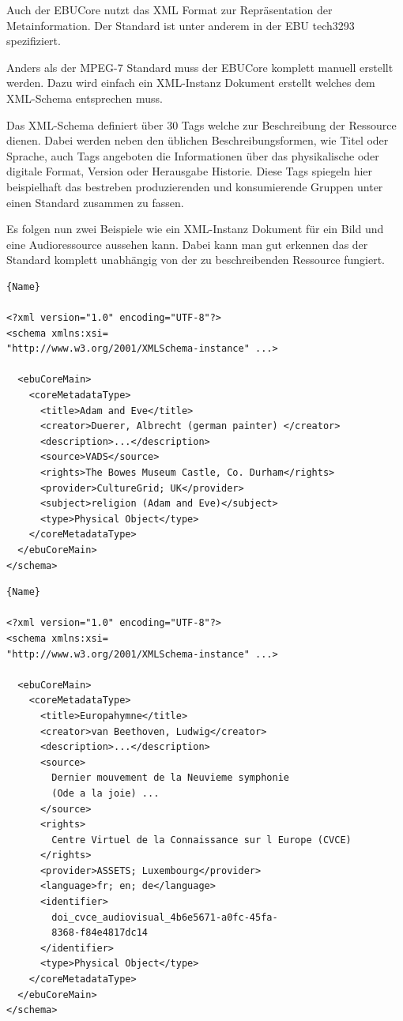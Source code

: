 	Auch der EBUCore nutzt das XML Format zur Repräsentation der Metainformation. Der Standard ist unter anderem in der EBU tech3293 spezifiziert.
	
	Anders als der MPEG-7 Standard muss der EBUCore komplett manuell erstellt werden. Dazu wird einfach ein XML-Instanz Dokument erstellt welches dem XML-Schema entsprechen muss.
	
	Das XML-Schema definiert über 30 Tags welche zur Beschreibung der Ressource dienen. Dabei werden neben den üblichen Beschreibungsformen, wie Titel oder Sprache, auch Tags angeboten die Informationen über das physikalische oder digitale  Format, Version oder Herausgabe Historie. Diese Tags spiegeln hier beispielhaft das bestreben produzierenden und konsumierende Gruppen unter einen Standard zusammen zu fassen.
	
	Es folgen nun zwei Beispiele wie ein XML-Instanz Dokument für ein Bild und eine Audioressource aussehen kann. Dabei kann man gut erkennen das der Standard komplett unabhängig von der zu beschreibenden Ressource fungiert.

\begin{lstlisting}[caption=Beispiel-XML EBUCore für Albrecht Dürers Bild: Adam und Eva]{Name}

<?xml version="1.0" encoding="UTF-8"?>
<schema xmlns:xsi=
"http://www.w3.org/2001/XMLSchema-instance" ...>

  <ebuCoreMain>
    <coreMetadataType>
      <title>Adam and Eve</title>
      <creator>Duerer, Albrecht (german painter) </creator>
      <description>...</description>
      <source>VADS</source>  
      <rights>The Bowes Museum Castle, Co. Durham</rights>
      <provider>CultureGrid; UK</provider>
      <subject>religion (Adam and Eve)</subject>
      <type>Physical Object</type>
    </coreMetadataType>
  </ebuCoreMain>
</schema>
\end{lstlisting}


\begin{lstlisting}[caption=Beispiel-XML EBUCore für die Europahymne]{Name}

<?xml version="1.0" encoding="UTF-8"?>
<schema xmlns:xsi=
"http://www.w3.org/2001/XMLSchema-instance" ...>

  <ebuCoreMain>
    <coreMetadataType>
      <title>Europahymne</title>
      <creator>van Beethoven, Ludwig</creator>
      <description>...</description>
      <source>
      	Dernier mouvement de la Neuvieme symphonie 
      	(Ode a la joie) ...
      </source>  
      <rights>
      	Centre Virtuel de la Connaissance sur l Europe (CVCE)
      </rights>
      <provider>ASSETS; Luxembourg</provider>
      <language>fr; en; de</language>
      <identifier>
      	doi_cvce_audiovisual_4b6e5671-a0fc-45fa-
      	8368-f84e4817dc14
      </identifier>
      <type>Physical Object</type>
    </coreMetadataType>
  </ebuCoreMain>
</schema>
\end{lstlisting}

